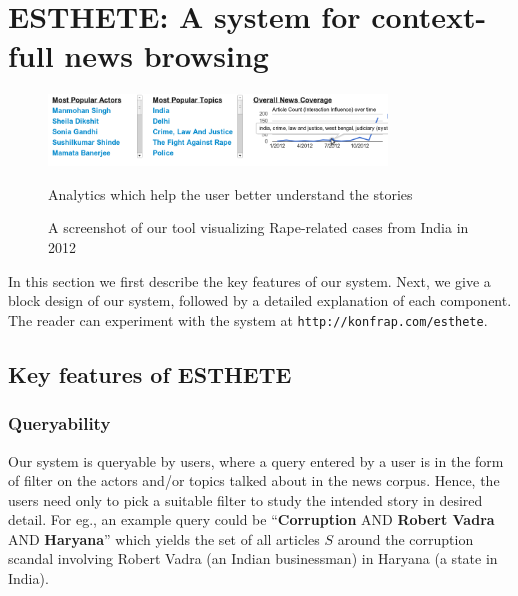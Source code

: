 \section{ESTHETE: A system for context-full news browsing }
\label{sec:block}
\begin{figure}[ht]
\begin{center}
\caption{Analytics which help the user better understand the stories}
\includegraphics[width=9cm,scale=0.30]{figures/faceted2.png}
\label{fig:faceted-search}
\end{center}
\end{figure}
\begin{figure}[ht]
\caption{A screenshot of our tool visualizing Rape-related cases from India in 2012}
\label{fig:complete-tool-screenshot}
\end{figure}


In this section we first describe the key features of our system. Next, we give a block design of our system, followed by a detailed explanation
of each component. The reader can experiment with the system at {\tt http://konfrap.com/esthete}.

\subsection{Key features of ESTHETE}
\subsubsection{Queryability}
Our system is queryable by users, where a query entered by a user is in the form of filter on the actors and/or topics talked about in the
news corpus. Hence, the users need only to pick a suitable filter to study the intended story in desired detail. For eg., an example query could
be ``{\bf Corruption} AND {\bf Robert Vadra} AND {\bf Haryana}'' which yields the set of all articles $S$ around the corruption scandal involving Robert Vadra
(an Indian businessman) in Haryana (a state in India). 

